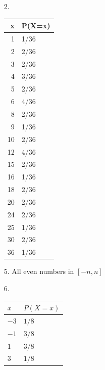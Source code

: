 \documentclass{article}
\begin{document}
\begin{itemize}
\item [2.]

\begin{tabular}{r|l}
x & P(X=x)\\
\hline
1 & 1/36\\
2 & 2/36\\
3 & 2/36\\
4 & 3/36\\
5 & 2/36\\
6 & 4/36\\
8 & 2/36\\
9 & 1/36\\
10 & 2/36\\
12 & 4/36\\
15 & 2/36\\
16 & 1/36\\
18 & 2/36\\
20 & 2/36\\
24 & 2/36\\
25 & 1/36\\
30 & 2/36\\
36 & 1/36\\
\end{tabular}

\item [5.]
  All even numbers in $[-n,n]$
\item [6.]
  
\begin{tabular}{l|l}
\(x\) & \(P(X=x)\)\\
\hline
\(-3\) & \(1/8\)\\
\(-1\) & \(3/8\)\\
\(1\) & \(3/8\)\\
\(3\) & \(1/8\)\\
\end{tabular}

\end{itemize}
\end{document}
